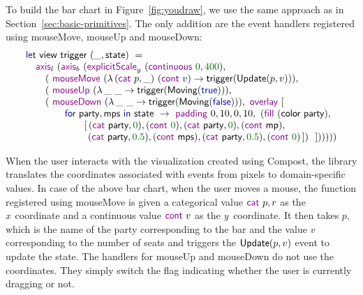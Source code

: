 \documentclass{jfp}
\newcommand{\X}{\emph{x}\ }
\newcommand{\Y}{\emph{y}\ }
\newcommand{\num}[1]{\textcolor{numclr}{#1}}
\newcommand{\ident}[1]{\textnormal{\textcolor{idclr}{\sffamily #1}}}
\newcommand{\kvd}[1]{\textnormal{\textcolor{kvdclr}{\sffamily #1}}}
\newcommand{\fkvd}[1]{\textnormal{\textcolor{fkvdclr}{\sffamily #1}}}
\begin{document}
To build the bar chart in Figure~\ref{fig:youdraw}, we use the same approach as in
Section~\ref{sec:basic-primitives}. The only addition are the event handlers registered using
\kvd{mouseMove}, \kvd{mouseUp} and \kvd{mouseDown}:
%
\begin{equation*}
\begin{array}{l}
\fkvd{let}~\ident{view}~\ident{trigger}~(\_, \ident{state})~=\\
\quad \kvd{axis}_l~(\kvd{axis}_b~(\kvd{explicitScale}_y~(\kvd{continuous}~\num{0},\num{400}),\\
\qquad (~\kvd{mouseMove}~(\lambda \,(\kvd{cat}~p,\_)~(\kvd{cont}~v)\rightarrow \ident{trigger}(\ident{Update}(p, v))),\\
\qquad (~\kvd{mouseUp}~(\lambda \,\_~\_\rightarrow \ident{trigger}(\ident{Moving}(\fkvd{true}))),\\
\qquad (~\kvd{mouseDown}~(\lambda \,\_~\_\rightarrow \ident{trigger}(\ident{Moving}(\fkvd{false}))),~\kvd{overlay}~[\\
\qquad \qquad \fkvd{for}~\ident{party}, \ident{mps}~\fkvd{in}~\ident{state}~\rightarrow~\kvd{padding}~0,10,0,10,~(\kvd{fill}~(\ident{color}~\ident{party}),\\
\qquad \qquad\quad\quad [\,(\kvd{cat}~\ident{party}, \num{0}), (\kvd{cont}~\num{0}), (\kvd{cat}~\ident{party}, \num{0}), (\kvd{cont}~\ident{mp}),\\
\qquad \qquad\quad\quad \hspace{0.38em}(\kvd{cat}~\ident{party}, \num{0.5}), (\kvd{cont}~\ident{mps}), (\kvd{cat}~\ident{party}, \num{0.5}), (\kvd{cont}~\num{0}) \,])~~])))))\\
\end{array}
\end{equation*}

When the user interacts with the visualization created using Compost, the library
translates the coordinates associated with events from pixels to domain-specific
values. In case of the above bar chart, when the user moves a mouse, the function registered
using \kvd{mouseMove} is given a categorical value $\kvd{cat}~p, r$ as the \X coordinate and
a continuous value $\kvd{cont}~v$ as the \Y coordinate. It then takes $p$, which is the name
of the party corresponding to the bar and the value $v$ corresponding to the number of seats
and triggers the $\ident{Update}(p, v)$ event to update the state. The handlers for
\kvd{mouseUp} and \kvd{mouseDown} do not use the coordinates. They simply switch the flag
indicating whether the user is currently dragging or not.
\end{document}

